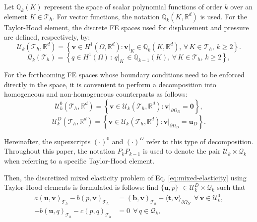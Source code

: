 \documentclass[english,11pt,3p,number,sort&compress]{elsarticle}
\begin{document}
Let $\mathbb{Q}_k(K)$ represent the space of scalar polynomial functions of order $k$ over an element $K\in\mathcal{T}_h$. For vector functions, the notation $\mathbb{Q}_k(K,\mathbb{R}^d)$ is used. For the Taylor-Hood element, the discrete FE spaces used for displacement and pressure are defined, respectively, by:
\begin{equation}
    \label{eq:uTH}
    \mathcal{U}_k(\mathcal{T}_h,\mathbb{R}^d) = \left\{\bm{v} \in H^1(\Omega,\mathbb{R}^d) : \bm{v}\lvert_{K} \in \mathbb{Q}_k(K,\mathbb{R}^d), \,\forall \,K \in \mathcal{T}_h, \, k\geq 2 \right\}.
\end{equation}
\begin{equation}
    \label{eq:qTH}
    \mathcal{Q}_k(\mathcal{T}_h) = \left\{q \in H^1(\Omega) \,:\, q\lvert_{K} \, \in \mathbb{Q}_{k-1}(K), \,\forall \, K \in \mathcal{T}_h, \, k\geq 2\right\},
\end{equation}

For the forthcoming FE spaces whose boundary conditions need to be enforced directly in the space, it is convenient to perform a decomposition into homogeneous and non-homogeneous counterparts as follows:
\begin{equation}
    \label{eq:uTH0}
    \mathcal{U}^0_k(\mathcal{T}_h,\mathbb{R}^d)=\left\{ \bm{v} \in \mathcal{U}_k(\mathcal{T}_h,\mathbb{R}^d) : \bm{v} \lvert_{\partial\Omega_D}=\bm{0}\right\},
\end{equation}
\begin{equation}
    \label{eq:uTHD}
    \mathcal{U}^D_k(\mathcal{T}_h,\mathbb{R}^d)=\left\{ \bm{v} \in \mathcal{U}_k(\mathcal{T}_h,\mathbb{R}^d) : \bm{v} \lvert_{\partial\Omega_D}=\bm{u}_D\right\}.
\end{equation}

\noindent Hereinafter, the superscripts $(\cdot)^0$ and $(\cdot)^D$ refer to this type of decomposition. Throughout this paper, the notation $P_k P_{k-1}$ is used to denote the pair $\mathcal{U}_k \times \mathcal{Q}_k$ when referring to a specific Taylor-Hood element.

Then, the discretized mixed elasticity problem of Eq. \eqref{eq:mixed-elasticity} using Taylor-Hood elements is formulated is follows: find $\{\bm{u},p\}$ $\in \mathcal{U}^D_k \times \mathcal{Q}_k$ such that
\begin{subequations} \label{eq:TH-weak}
	\begin{align}
		a\left(\bm{u},\bm{v}\right)_{\mathcal{T}_h} - b\left( p, \bm{v}\right)_{\mathcal{T}_h} &= \left(\bm{b},\bm{v}\right)_{\mathcal{T}_h} + \langle\bm{t},\bm{v}\rangle_{\partial\Omega_N} ~~\forall\, \bm{v} \in \mathcal{U}^0_k,\label{eq:TH-weak-a}\\ 
		-b\left(\bm{u}, q\right)_{\mathcal{T}_h} - c\left(p,q \right)_{\mathcal{T}_h} &= 0 ~~\forall\, q \in \mathcal{Q}_k, \label{eq:TH-weak-b}
	\end{align}
\end{subequations}
\end{document}
